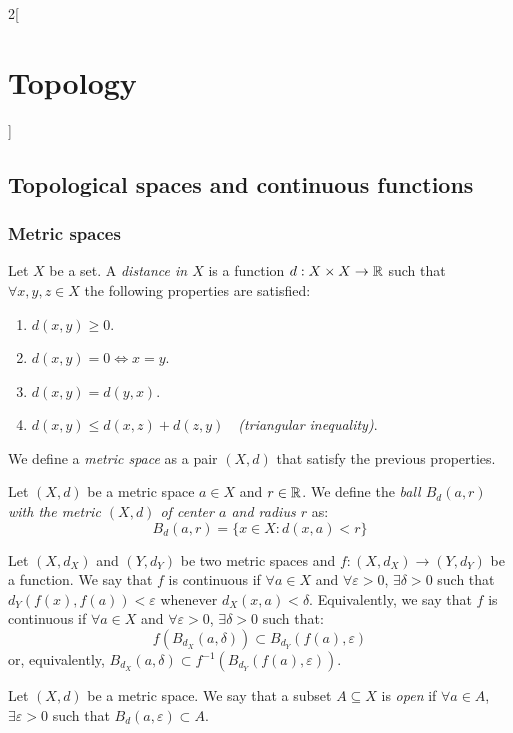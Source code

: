\documentclass[../../../main.tex]{subfiles}
\begin{document}
\begin{multicols}{2}[\section{Topology}]
  \subsection{Topological spaces and continuous functions}
  \subsubsection{Metric spaces}
  \begin{definition}
    Let $X$ be a set. A \textit{distance in $X$} is a function $d:X\times X\rightarrow\mathbb{R} $ such that $\forall x,y,z\in X$ the following properties are satisfied:
    \begin{enumerate}
      \item $d(x,y)\geq 0$.
      \item $d(x,y)=0\iff x=y$.
      \item $d(x,y)=d(y,x)$.
      \item $d(x,y)\leq d(x,z)+d(z,y)\quad$\textit{(triangular inequality)}.
    \end{enumerate}
    We define a \textit{metric space} as a pair $(X,d)$ that satisfy the previous properties.
  \end{definition}
  \begin{definition}
    Let $(X,d)$ be a metric space $a\in X$ and $r\in\mathbb{R}$. We define the \textit{ball $B_d(a,r)$ with the metric $(X,d)$ of center $a$ and radius $r$} as: $$B_d(a,r)=\{x\in X:d(x,a)<r\}$$
  \end{definition}
  \begin{definition}
    Let $(X,d_X)$ and $(Y,d_Y)$ be two metric spaces and $f:(X,d_X)\rightarrow(Y,d_Y)$ be a function. We say that $f$ is continuous if $\forall a\in X$ and $\forall\varepsilon>0$, $\exists\delta>0$ such that $d_Y(f(x),f(a))<\varepsilon$ whenever $d_X(x,a)<\delta$. Equivalently, we say that $f$ is continuous if $\forall a\in X$ and $\forall\varepsilon>0$, $\exists\delta>0$ such that: $$f(B_{d_X}(a,\delta))\subset B_{d_Y}(f(a),\varepsilon)$$ or, equivalently, $B_{d_X}(a,\delta)\subset f^{-1}\left(B_{d_Y}(f(a),\varepsilon)\right)$.
  \end{definition}
  \begin{definition}
    Let $(X,d)$ be a metric space. We say that a subset $A\subseteq X$ is \textit{open} if $\forall a\in A$, $\exists\varepsilon>0$ such that $B_d(a,\varepsilon)\subset A$.

\end{definition}
\end{multicols}
\end{document}
